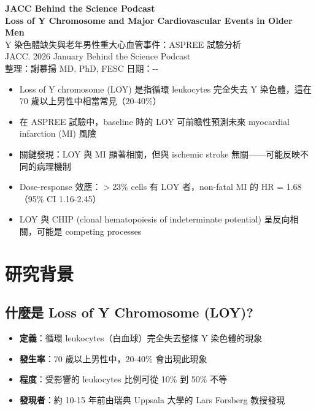 \documentclass[12pt,a4paper]{article}
\newcommand{\keyfinding}[1]{
    \par
    \noindent
    \begin{tcolorbox}[
        colback=yellow!10!white,
        colframe=orange!75!black,
        title=\textbf{核心發現摘要},
        fonttitle=\bfseries,
        boxrule=0.5pt,
        arc=3pt
    ]
    #1
    \end{tcolorbox}
}
\newcommand{\mydate}{\the\year-\the\month-\the\day}
\begin{document}
\begin{center}
{\LARGE\bfseries\textcolor{emergency_red}{JACC Behind the Science Podcast}}\\[0.5cm]
{\Large\textbf{Loss of Y Chromosome and Major Cardiovascular Events in Older Men}}\\[0.3cm]
{\large Y 染色體缺失與老年男性重大心血管事件：ASPREE 試驗分析}\\[0.5cm]
{\normalsize JACC. 2026 January Behind the Science Podcast}\\[0.3cm]
{\normalsize 整理：謝慕揚 MD, PhD, FESC \quad 日期：\mydate}
\end{center}

\vspace{0.5cm}

\keyfinding{
\begin{itemize}[leftmargin=*]
    \item Loss of Y chromosome (LOY) 是指循環 leukocytes 完全失去 Y 染色體，這在 70 歲以上男性中相當常見（20-40\%）
    \item 在 ASPREE 試驗中，baseline 時的 LOY 可前瞻性預測未來 myocardial infarction (MI) 風險
    \item 關鍵發現：LOY 與 MI 顯著相關，但與 ischemic stroke 無關——可能反映不同的病理機制
    \item Dose-response 效應：$>$23\% cells 有 LOY 者，non-fatal MI 的 HR = 1.68（95\% CI 1.16-2.45）
    \item LOY 與 CHIP (clonal hematopoiesis of indeterminate potential) 呈反向相關，可能是 competing processes
\end{itemize}
}

\section{研究背景}

\subsection{什麼是 Loss of Y Chromosome (LOY)?}

\begin{itemize}
    \item \textbf{定義}：循環 leukocytes（白血球）完全失去整條 Y 染色體的現象
    \item \textbf{發生率}：70 歲以上男性中，20-40\% 會出現此現象
    \item \textbf{程度}：受影響的 leukocytes 比例可從 10\% 到 50\% 不等
    \item \textbf{發現者}：約 10-15 年前由瑞典 Uppsala 大學的 Lars Forsberg 教授發現
\end{itemize}
\end{document}
